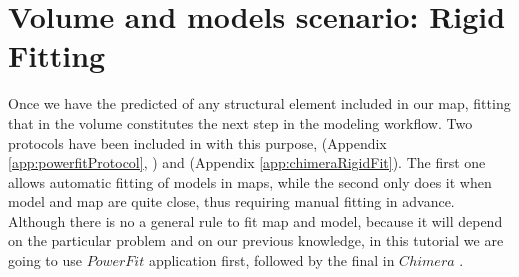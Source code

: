 \section{Volume and models scenario: Rigid Fitting}
Once we have the predicted  of any structural element included in our map, fitting that  in the volume constitutes the next step in the modeling workflow. Two protocols have been included in \scipion with this purpose,  (Appendix \ref{app:powerfitProtocol}, \citep{vanzundert2016}) and  (Appendix \ref{app:chimeraRigidFit}). The first one allows automatic fitting of models in maps, while the second only does it when model and map are quite close, thus requiring manual fitting in advance. Although there is no a general rule to fit map and model, because it will depend on the particular problem and on our previous knowledge, in this tutorial we are going to use $PowerFit$ application first, followed by the final  in $Chimera$ .

